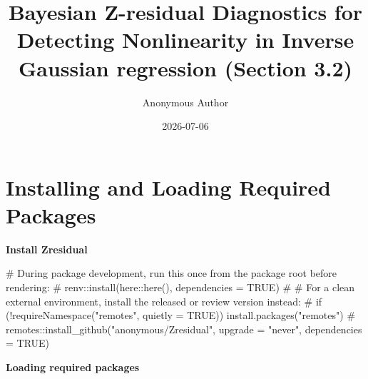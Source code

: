 \documentclass[
  english,
  letterpaper,
  DIV=11,
  numbers=noendperiod]{scrartcl}
\title{Bayesian Z-residual Diagnostics for Detecting Nonlinearity in
Inverse Gaussian regression (Section 3.2)}
\author{Anonymous Author}
\date{2026-07-06}
\newenvironment{Shaded}{\begin{snugshade}}{\end{snugshade}}
\newcommand{\CommentTok}[1]{\textcolor[rgb]{0.37,0.37,0.37}{#1}}
\begin{document}
\maketitle


\section{Installing and Loading Required
Packages}\label{installing-and-loading-required-packages}

\textbf{Install Zresidual}

\begin{Shaded}
\begin{Highlighting}[]
\CommentTok{\# During package development, run this once from the package root before rendering:}
\CommentTok{\# renv::install(here::here(), dependencies = TRUE)}
\CommentTok{\#}
\CommentTok{\# For a clean external environment, install the released or review version instead:}
\CommentTok{\# if (!requireNamespace("remotes", quietly = TRUE)) install.packages("remotes")}
\CommentTok{\# remotes::install\_github("anonymous/Zresidual", upgrade = "never", dependencies = TRUE)}
\end{Highlighting}
\end{Shaded}

\textbf{Loading required packages}
\end{document}

